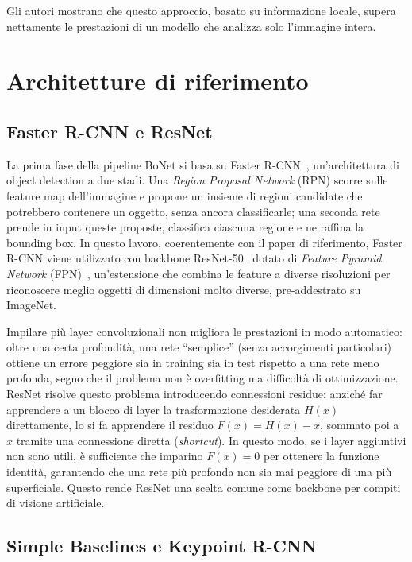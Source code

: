 Gli autori mostrano che questo approccio, basato su informazione locale,
supera nettamente le prestazioni di un modello che analizza solo
l'immagine intera.

\section{Architetture di riferimento}
\label{sec:architetture}

\subsection{Faster R-CNN e ResNet}

La prima fase della pipeline BoNet si basa su Faster
R-CNN~\cite{ren2015fasterrcnn}, un'architettura di object detection a due
stadi. Una \emph{Region Proposal Network} (RPN) scorre sulle feature map
dell'immagine e propone un insieme di regioni candidate che potrebbero
contenere un oggetto, senza ancora classificarle; una seconda rete prende
in input queste proposte, classifica ciascuna regione e ne raffina la
bounding box. In questo lavoro, coerentemente con il paper di
riferimento, Faster R-CNN viene utilizzato con backbone
ResNet-50~\cite{he2016resnet} dotato di \emph{Feature Pyramid Network}
(FPN)~\cite{lin2017fpn}, un'estensione che combina le feature a diverse
risoluzioni per riconoscere meglio oggetti di dimensioni molto diverse,
pre-addestrato su ImageNet.

Impilare più layer convoluzionali non migliora le prestazioni in modo
automatico: oltre una certa profondità, una rete ``semplice'' (senza
accorgimenti particolari) ottiene un errore peggiore sia in training sia
in test rispetto a una rete meno profonda, segno che il problema non è
overfitting ma difficoltà di ottimizzazione. ResNet risolve questo
problema introducendo connessioni residue: anziché far apprendere a un
blocco di layer la trasformazione desiderata $H(x)$ direttamente, lo si
fa apprendere il residuo $F(x) = H(x) - x$, sommato poi a $x$ tramite
una connessione diretta (\emph{shortcut}). In questo modo, se i layer
aggiuntivi non sono utili, è sufficiente che imparino $F(x) = 0$ per
ottenere la funzione identità, garantendo che una rete più profonda non
sia mai peggiore di una più superficiale. Questo rende ResNet una
scelta comune come backbone per compiti di visione artificiale.

\subsection{Simple Baselines e Keypoint R-CNN}

